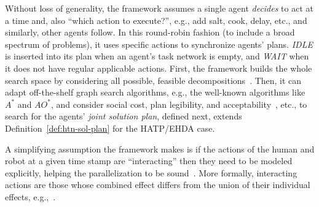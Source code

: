 \documentclass[letterpaper]{article} %
\begin{document}


Without loss of generality, the framework assumes a single agent \textit{decides} to act at a time and, also ``which action to execute?'', e.g., add salt, cook, delay, etc., and similarly, other agents follow. 
In this round-robin fashion (to include a broad spectrum of problems), it uses specific actions to synchronize agents' plans. {\em IDLE} is inserted into its plan when an agent's task network is empty, and {\em WAIT} when it does not have regular applicable actions.
First, the framework builds the whole search space by considering all possible, feasible decompositions~\cite{buisan:hal-03684211}. 
Then, it can adapt off-the-shelf graph search algorithms, e.g., the well-known algorithms like $A^*$ and $AO^*$, and consider social cost, plan legibility, and acceptability~\cite{alili2009task}, etc., to search for the agents' \textit{joint solution plan}, defined next, extends Definition~\ref{def:htn-sol-plan} for the HATP/EHDA case. 

A simplifying assumption the framework makes is if the actions of the human and robot at a given time stamp are ``interacting'' then they need to be modeled explicitly, helping the parallelization to be sound~\cite{CrosbyJR14}. More formally, interacting actions are those whose combined effect differs from the union of their individual effects, e.g.,~\cite{ShekharB20}. 
\end{document}
